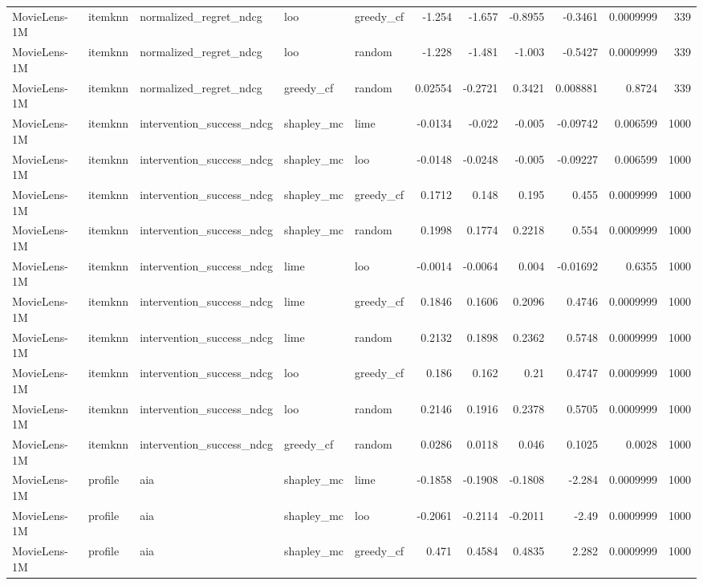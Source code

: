 \begin{table}[t]
\begin{tabular}{lllllrrrrrr}
MovieLens-1M & itemknn & normalized\_regret\_ndcg & loo & greedy\_cf & -1.254 & -1.657 & -0.8955 & -0.3461 & 0.0009999 & 339 \\
MovieLens-1M & itemknn & normalized\_regret\_ndcg & loo & random & -1.228 & -1.481 & -1.003 & -0.5427 & 0.0009999 & 339 \\
MovieLens-1M & itemknn & normalized\_regret\_ndcg & greedy\_cf & random & 0.02554 & -0.2721 & 0.3421 & 0.008881 & 0.8724 & 339 \\
MovieLens-1M & itemknn & intervention\_success\_ndcg & shapley\_mc & lime & -0.0134 & -0.022 & -0.005 & -0.09742 & 0.006599 & 1000 \\
MovieLens-1M & itemknn & intervention\_success\_ndcg & shapley\_mc & loo & -0.0148 & -0.0248 & -0.005 & -0.09227 & 0.006599 & 1000 \\
MovieLens-1M & itemknn & intervention\_success\_ndcg & shapley\_mc & greedy\_cf & 0.1712 & 0.148 & 0.195 & 0.455 & 0.0009999 & 1000 \\
MovieLens-1M & itemknn & intervention\_success\_ndcg & shapley\_mc & random & 0.1998 & 0.1774 & 0.2218 & 0.554 & 0.0009999 & 1000 \\
MovieLens-1M & itemknn & intervention\_success\_ndcg & lime & loo & -0.0014 & -0.0064 & 0.004 & -0.01692 & 0.6355 & 1000 \\
MovieLens-1M & itemknn & intervention\_success\_ndcg & lime & greedy\_cf & 0.1846 & 0.1606 & 0.2096 & 0.4746 & 0.0009999 & 1000 \\
MovieLens-1M & itemknn & intervention\_success\_ndcg & lime & random & 0.2132 & 0.1898 & 0.2362 & 0.5748 & 0.0009999 & 1000 \\
MovieLens-1M & itemknn & intervention\_success\_ndcg & loo & greedy\_cf & 0.186 & 0.162 & 0.21 & 0.4747 & 0.0009999 & 1000 \\
MovieLens-1M & itemknn & intervention\_success\_ndcg & loo & random & 0.2146 & 0.1916 & 0.2378 & 0.5705 & 0.0009999 & 1000 \\
MovieLens-1M & itemknn & intervention\_success\_ndcg & greedy\_cf & random & 0.0286 & 0.0118 & 0.046 & 0.1025 & 0.0028 & 1000 \\
MovieLens-1M & profile & aia & shapley\_mc & lime & -0.1858 & -0.1908 & -0.1808 & -2.284 & 0.0009999 & 1000 \\
MovieLens-1M & profile & aia & shapley\_mc & loo & -0.2061 & -0.2114 & -0.2011 & -2.49 & 0.0009999 & 1000 \\
MovieLens-1M & profile & aia & shapley\_mc & greedy\_cf & 0.471 & 0.4584 & 0.4835 & 2.282 & 0.0009999 & 1000 \\

\end{tabular}
\end{table}
